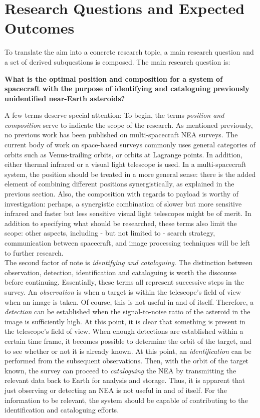 \section{Research Questions and Expected Outcomes}
\label{sec:researchquestions}

To translate the aim into a concrete research topic, a main research question and a set of derived subquestions is composed. The main research question is:

\begin{center}\large\textbf{What is the optimal position and composition for a system of spacecraft with the purpose of identifying and cataloguing previously unidentified near-Earth asteroids?}\end{center}

A few terms deserve special attention: To begin, the terms \textit{position and composition} serve to indicate the scope of the research. As mentioned previously, no previous work has been published on multi-spacecraft NEA surveys. The current body of work on space-based surveys commonly uses general categories of orbits such as Venus-trailing orbits, or orbits at Lagrange points. In addition, either thermal infrared or a visual light telescope is used. In a multi-spacecraft system, the position should be treated in a more general sense: there is the added element of combining different positions synergistically, as explained in the previous section. Also, the composition with regards to payload is worthy of investigation: perhaps, a synergistic combination of slower but more sensitive infrared and faster but less sensitive visual light telescopes might be of merit. In addition to specifying what should be researched, these terms also limit the scope: other aspects, including - but not limited to - search strategy, communication between spacecraft, and image processing techniques will be left to further research. \\

The second factor of note is \textit{identifying and cataloguing}. The distinction between observation, detection, identification and cataloguing is worth the discourse before continuing. Essentially, these terms all represent successive steps in the survey. An \textit{observation} is when a target is within the telescope's field of view when an image is taken. Of course, this is not useful in and of itself. Therefore, a \textit{detection} can be established when the signal-to-noise ratio of the asteroid in the image is sufficiently high. At this point, it is clear that something is present in the telescope's field of view. When enough detections are established within a certain time frame, it becomes possible to determine the orbit of the target, and to see whether or not it is already known. At this point, an \textit{identification} can be performed from the subsequent observations. Then, with the orbit of the target known, the survey can proceed to \textit{cataloguing} the NEA by transmitting the relevant data back to Earth for analysis and storage. Thus, it is apparent that just observing or detecting an NEA is not useful in and of itself. For the information to be relevant, the system should be capable of contributing to the identification and cataloguing efforts. \\

